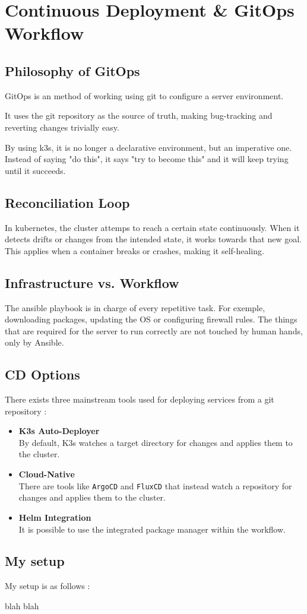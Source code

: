 \chapter{Continuous Deployment \& GitOps Workflow}\label{chap:gitops}

\section{Philosophy of GitOps}
GitOps is an method of working using \gls{git} to configure a server environment.

It uses the git repository as the source of truth, making bug-tracking and reverting changes trivially easy.

By using \gls{k3s}, it is no longer a declarative environment, but an imperative one. Instead of saying "do this", it says "try to become this" and it will keep trying until it succeeds.

\section{Reconciliation Loop}
In kubernetes, the cluster attemps to reach a certain state continuously. When it detects drifts or changes from the intended state, it works towards that new goal. 
This applies when a container breaks or crashes, making it self-healing. 

\section{Infrastructure vs. Workflow}
The \gls{ansible} playbook is in charge of every repetitive task. For exemple, downloading packages, updating the OS or configuring firewall rules. The things that are required for the server to run correctly are not touched by human hands, only by Ansible.

\section{CD Options}
There exists three mainstream tools used for deploying services from a git repository :

\begin{itemize}
	\item \textbf{K3s Auto-Deployer} \\
	By default, K3s watches a target directory for changes and applies them to the cluster.
	\item \textbf{Cloud-Native} \\
	There are tools like \texttt{ArgoCD} and \texttt{FluxCD} that instead watch a repository for changes and applies them to the cluster.
	\item \textbf{Helm Integration} \\
	It is possible to use the integrated package manager within the workflow.
	
\end{itemize}

\section{My setup}
My setup is as follows :

blah blah